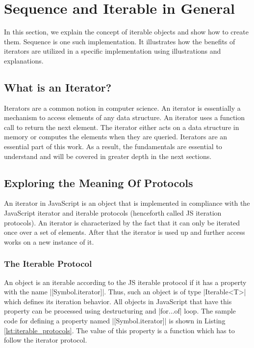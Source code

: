 \section{Sequence and Iterable in General}
\label{sec:Sequence and Iterable in General}
In this section, we explain the concept of iterable objects and show how to 
create them. Sequence is one such implementation. It illustrates how the 
benefits of iterators are utilized in a specific implementation using 
illustrations and explanations.

\subsection{What is an Iterator?}
\label{sub:What is an Iterator?}
Iterators are a common notion in computer science. An iterator is essentially 
a mechanism to access elements of any data structure. An iterator uses a 
function call to return the next element. The iterator either acts on a data 
structure in memory or computes the elements when they are queried. Iterators 
are an essential part of this work. As a result, the fundamentals are essential 
to understand and will be covered in greater depth in the next sections.

\subsection{Exploring the Meaning Of Protocols}
\label{sub:Exploring the Meaning Of Protocols}
An iterator in JavaScript is an object that is implemented in compliance with
the JavaScript iterator and iterable protocols \cite{mdn_iteration_2023}
(henceforth called JS iteration protocols). An iterator is characterized by the
fact that it can only be iterated once over a set of elements. After that the
iterator is used up and further access works on a new instance of it.


\subsubsection{The Iterable Protocol}
\label{subsub:The Iterable Protocol}
An object is an iterable according to the JS iterable protocol if it has a
property with the name |[Symbol.iterator]|. Thus, such an object is of type
|Iterable<T>| which defines its iteration behavior. All objects in JavaScript
that have this property can be processed using destructuring and |for...of|
loop. The sample code for defining a property named |[Symbol.iterator]| is shown
in Listing \ref{lst:iterable_protocols}. The value of this property is a
function which has to follow the iterator protocol.

